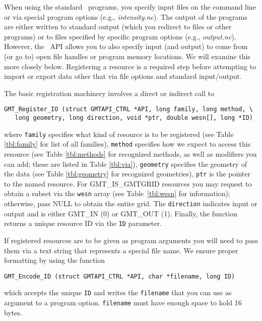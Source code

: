\documentclass{report}
\begin{document}
When using the standard \GMT\ programs, you specify input files on
the command line or via special program options (e.g., \emph{intensity.nc}). The output of
the programs are either written to standard output (which you redirect to files or other programs)
or to files specified by specific program options (e.g., \emph{output.nc}).  However, the
\GMT\ API allows you to also specify input (and output) to come from (or go to) open file handles
or program memory locations.  We will examine this more closely below.  Registering a
resource is a required step before attempting to import or export data other that via file options
and standard input/output.

The basic registration machinery involves a direct or indirect call to

\begin{verbatim}
GMT_Register_IO (struct GMTAPI_CTRL *API, long family, long method, \
   long geometry, long direction, void *ptr, double wesn[], long *ID)
\end{verbatim}
where \texttt{family} specifies what kind of resource is to be registered
(see Table \ref{tbl:family} for list of all families), \texttt{method} specifies
how we expect to access this resource (see Table \ref{tbl:methods} for recognized methods,
as well as modifiers you can add; these are listed in Table \ref{tbl:via}),
\texttt{geometry} specifies
the geometry of the data (see Table \ref{tbl:geometry} for recognized geometries),
\texttt{ptr} is the pointer to the named resource.
For GMT\_IS\_GMTGRID resources you may request to obtain a subset via the \texttt{wesn}
array (see Table~\ref{tbl:wesn} for information); otherwise, pass NULL to obtain the entire grid.
The \texttt{direction} indicates input or output and is either GMT\_IN (0) or GMT\_OUT (1).
Finally, the function returns a unique resource ID via the \texttt{ID} parameter.

If registered resources are to be given as program arguments you will need to pass them via
a text string that represents a special file name.  We ensure proper formatting by using the
function

\begin{verbatim}
GMT_Encode_ID (struct GMTAPI_CTRL *API, char *filename, long ID)
\end{verbatim}
which accepts the unique \texttt{ID} and writes the \texttt{filename} that
you can use as argument to a program option.  \texttt{filename} must have enough space to hold 16 bytes.
\end{document}
